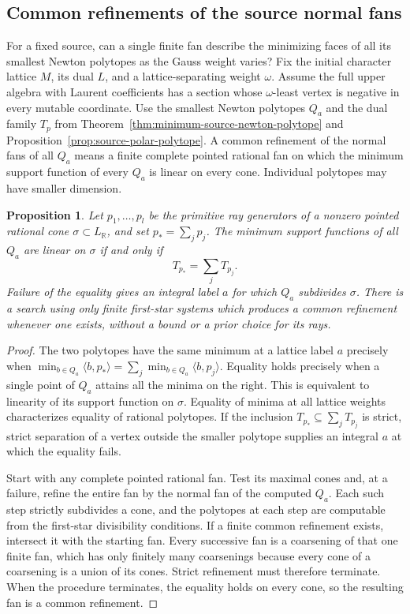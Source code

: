 \documentclass[11pt,reqno]{amsart}
\numberwithin{equation}{section}
\newtheorem{proposition}[theorem]{Proposition}
\theoremstyle{definition}
\theoremstyle{remark}
\begin{document}
\subsection{Common refinements of the source normal fans}

For a fixed source, can a single finite fan describe the minimizing
faces of all its smallest Newton polytopes as the Gauss weight varies?
Fix the initial character lattice \(M\), its dual \(L\), and a
lattice-separating weight \(\omega\). Assume the full upper algebra
with Laurent coefficients has a section whose \(\omega\)-least vertex
is negative in every mutable coordinate. Use the smallest Newton
polytopes \(Q_a\) and the dual family \(T_p\) from
Theorem~\ref{thm:minimum-source-newton-polytope} and
Proposition~\ref{prop:source-polar-polytope}. A common refinement of
the normal fans of all \(Q_a\) means a finite complete pointed rational
fan on which the minimum support function of every \(Q_a\) is linear
on every cone. Individual polytopes may have smaller dimension.

\begin{proposition}\label{prop:discover-source-fan}
Let \(p_1,\ldots,p_l\) be the primitive ray generators of a nonzero
pointed rational cone \(\sigma\subset L_{\mathbb R}\), and set
\(p_*=\sum_jp_j\). The minimum support functions of all \(Q_a\) are
linear on \(\sigma\) if and only if
\[ T_{p_*}=\sum_j T_{p_j}. \]
Failure of the equality gives an integral label \(a\) for which
\(Q_a\) subdivides \(\sigma\). There is a search using only finite
first-star systems which produces a common refinement whenever one
exists, without a bound or a prior choice for its rays.
\end{proposition}
\begin{proof}
The two polytopes have the same minimum at a lattice label \(a\) precisely when
\(\min_{b\in Q_a}\langle b,p_*\rangle =\sum_j\min_{b\in Q_a}\langle b,p_j\rangle\).
Equality holds precisely when a single point of \(Q_a\) attains all
the minima on the right. This is equivalent to linearity of its
support function on \(\sigma\). Equality of minima at all lattice
weights characterizes equality of rational polytopes. If the
inclusion \(T_{p_*}\subseteq\sum_jT_{p_j}\) is strict, strict
separation of a vertex outside the smaller polytope supplies an
integral \(a\) at which the equality fails.

Start with any complete pointed rational fan. Test its maximal cones
and, at a failure, refine the entire fan by the normal fan of the
computed \(Q_a\). Each such step strictly subdivides a cone, and the
polytopes at each step are computable from the first-star divisibility conditions.
If a finite common refinement exists, intersect it with the starting
fan. Every successive fan is a coarsening of that one finite fan,
which has only finitely many coarsenings because every cone of a
coarsening is a union of its cones. Strict refinement must therefore terminate.
When the procedure terminates, the equality holds on every cone,
so the resulting fan is a common refinement.
\end{proof}
\end{document}
